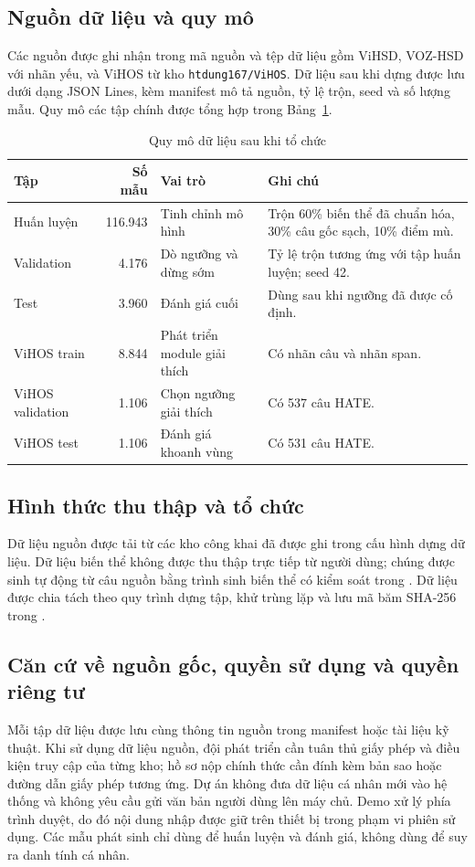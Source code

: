 \documentclass[12pt,a4paper]{article}
\newcommand{\sourcepath}[1]{\texttt{\detokenize{#1}}}
\begin{document}
\subsection{Nguồn dữ liệu và quy mô}
Các nguồn được ghi nhận trong mã nguồn và tệp dữ liệu gồm ViHSD, VOZ-HSD với nhãn yếu, và ViHOS từ kho \texttt{htdung167/ViHOS}. Dữ liệu sau khi dựng được lưu dưới dạng JSON Lines, kèm manifest mô tả nguồn, tỷ lệ trộn, seed và số lượng mẫu. Quy mô các tập chính được tổng hợp trong Bảng~\ref{tab:data-size}.

\begin{table}[H]
\centering
\caption{Quy mô dữ liệu sau khi tổ chức}
\label{tab:data-size}
\begin{tabularx}{\textwidth}{l r l X}
\toprule
\textbf{Tập} & \textbf{Số mẫu} & \textbf{Vai trò} & \textbf{Ghi chú}\\
\midrule
Huấn luyện & 116.943 & Tinh chỉnh mô hình & Trộn 60\% biến thể đã chuẩn hóa, 30\% câu gốc sạch, 10\% điểm mù.\\
Validation & 4.176 & Dò ngưỡng và dừng sớm & Tỷ lệ trộn tương ứng với tập huấn luyện; seed 42.\\
Test & 3.960 & Đánh giá cuối & Dùng sau khi ngưỡng đã được cố định.\\
ViHOS train & 8.844 & Phát triển module giải thích & Có nhãn câu và nhãn span.\\
ViHOS validation & 1.106 & Chọn ngưỡng giải thích & Có 537 câu HATE.\\
ViHOS test & 1.106 & Đánh giá khoanh vùng & Có 531 câu HATE.\\
\bottomrule
\end{tabularx}
\end{table}

\subsection{Hình thức thu thập và tổ chức}
Dữ liệu nguồn được tải từ các kho công khai đã được ghi trong cấu hình dựng dữ liệu. Dữ liệu biến thể không được thu thập trực tiếp từ người dùng; chúng được sinh tự động từ câu nguồn bằng trình sinh biến thể có kiểm soát trong \sourcepath{src/variant_generator/}. Dữ liệu được chia tách theo quy trình dựng tập, khử trùng lặp và lưu mã băm SHA-256 trong \sourcepath{data/CHECKSUMS.json}.

\subsection{Căn cứ về nguồn gốc, quyền sử dụng và quyền riêng tư}
Mỗi tập dữ liệu được lưu cùng thông tin nguồn trong manifest hoặc tài liệu kỹ thuật. Khi sử dụng dữ liệu nguồn, đội phát triển cần tuân thủ giấy phép và điều kiện truy cập của từng kho; hồ sơ nộp chính thức cần đính kèm bản sao hoặc đường dẫn giấy phép tương ứng. Dự án không đưa dữ liệu cá nhân mới vào hệ thống và không yêu cầu gửi văn bản người dùng lên máy chủ. Demo xử lý phía trình duyệt, do đó nội dung nhập được giữ trên thiết bị trong phạm vi phiên sử dụng. Các mẫu phát sinh chỉ dùng để huấn luyện và đánh giá, không dùng để suy ra danh tính cá nhân.
\end{document}
